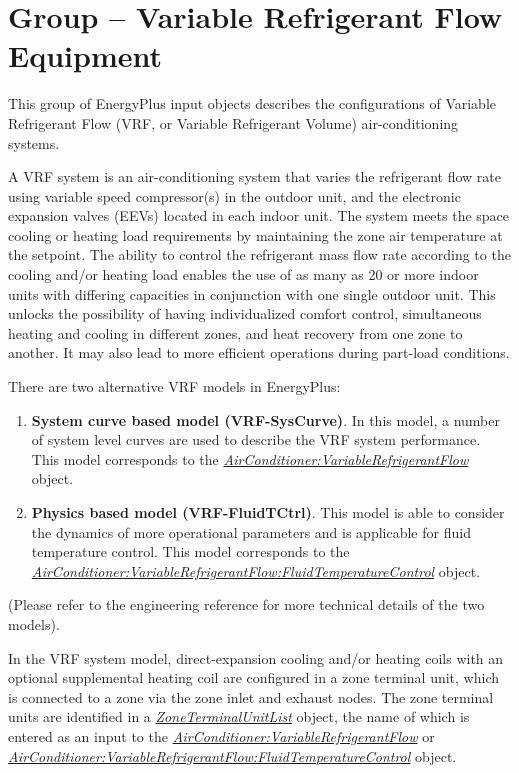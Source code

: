 \section{Group -- Variable Refrigerant Flow Equipment}\label{group-variable-refrigerant-flow-equipment}

This group of EnergyPlus input objects describes the configurations of Variable Refrigerant Flow (VRF, or Variable Refrigerant Volume) air-conditioning systems.

A VRF system is an air-conditioning system that varies the refrigerant flow rate using variable speed compressor(s) in the outdoor unit, and the electronic expansion valves (EEVs) located in each indoor unit. The system meets the space cooling or heating load requirements by maintaining the zone air temperature at the setpoint. The ability to control the refrigerant mass flow rate according to the cooling and/or heating load enables the use of as many as 20 or more indoor units with differing capacities in conjunction with one single outdoor unit. This unlocks the possibility of having individualized comfort control, simultaneous heating and cooling in different zones, and heat recovery from one zone to another. It may also lead to more efficient operations during part-load conditions.

There are two alternative VRF models in EnergyPlus:

\begin{enumerate}
\def\labelenumi{\arabic{enumi}.}
\item
  \textbf{System curve based model (VRF-SysCurve)}. In this model, a number of system level curves are used to describe the VRF system performance. This model corresponds to the \emph{\hyperref[airconditionervariablerefrigerantflow]{AirConditioner:VariableRefrigerantFlow}} object.
\item
  \textbf{Physics based model (VRF-FluidTCtrl)}. This model is able to consider the dynamics of more operational parameters and is applicable for fluid temperature control. This model corresponds to the \emph{\hyperref[airconditionervariablerefrigerantflowfluidtemperaturecontrol]{AirConditioner:VariableRefrigerantFlow:FluidTemperatureControl}} object.
\end{enumerate}

(Please refer to the engineering reference for more technical details of the two models).

In the VRF system model, direct-expansion cooling and/or heating coils with an optional supplemental heating coil are configured in a zone terminal unit, which is connected to a zone via the zone inlet and exhaust nodes. The zone terminal units are identified in a \emph{\hyperref[zoneterminalunitlist]{ZoneTerminalUnitList}} object, the name of which is entered as an input to the \emph{\hyperref[airconditionervariablerefrigerantflow]{AirConditioner:VariableRefrigerantFlow}} or \emph{\hyperref[airconditionervariablerefrigerantflowfluidtemperaturecontrol]{AirConditioner:VariableRefrigerantFlow:FluidTemperatureControl}} object.

